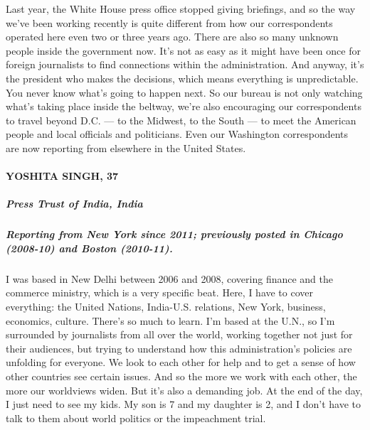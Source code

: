 Last year, the White House press office stopped giving briefings, and so
the way we've been working recently is quite different from how our
correspondents operated here even two or three years ago. There are also
so many unknown people inside the government now. It's not as easy as it
might have been once for foreign journalists to find connections within
the administration. And anyway, it's the president who makes the
decisions, which means everything is unpredictable. You never know
what's going to happen next. So our bureau is not only watching what's
taking place inside the beltway, we're also encouraging our
correspondents to travel beyond D.C. --- to the Midwest, to the South
--- to meet the American people and local officials and politicians.
Even our Washington correspondents are now reporting from elsewhere in
the United States.

\hypertarget{yoshita-singh-37}{%
\paragraph{YOSHITA SINGH, 37}\label{yoshita-singh-37}}

\hypertarget{press-trust-of-india-india-1}{%
\subparagraph{\texorpdfstring{\textbf{Press Trust of India,
India}}{Press Trust of India, India}}\label{press-trust-of-india-india-1}}

\hypertarget{reporting-from-new-york-since-2011-previously-posted-in-chicago-2008-10-and-boston-2010-11}{%
\subparagraph{\texorpdfstring{\textbf{Reporting from New York since
2011; previously posted in Chicago (2008-10) and Boston
(2010-11).}}{Reporting from New York since 2011; previously posted in Chicago (2008-10) and Boston (2010-11).}}\label{reporting-from-new-york-since-2011-previously-posted-in-chicago-2008-10-and-boston-2010-11}}

I was based in New Delhi between 2006 and 2008, covering finance and the
commerce ministry, which is a very specific beat. Here, I have to cover
everything: the United Nations, India-U.S. relations, New York,
business, economics, culture. There's so much to learn. I'm based at the
U.N., so I'm surrounded by journalists from all over the world, working
together not just for their audiences, but trying to understand how this
administration's policies are unfolding for everyone. We look to each
other for help and to get a sense of how other countries see certain
issues. And so the more we work with each other, the more our worldviews
widen. But it's also a demanding job. At the end of the day, I just need
to see my kids. My son is 7 and my daughter is 2, and I don't have to
talk to them about world politics or the impeachment trial.

